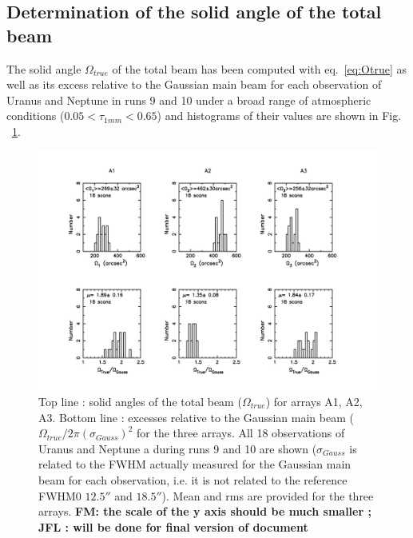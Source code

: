 \subsection{Determination of the solid angle of the total beam}
\label{ap:aperture_photometry_solang}


The solid angle $\Omega_{true}$ of the total beam has been computed with  eq.~\ref{eq:Otrue}
as well as its excess relative to the Gaussian main beam 
for each  observation of Uranus and Neptune in  runs 9 and 10 under a broad range of atmospheric conditions
($0.05 < \tau_{1mm} < 0.65$)  and histograms of their values are shown in Fig. ~\ref{fig:Otrue}.

\begin{figure}[th]
\begin{center}
  \includegraphics[clip, angle=0, scale=0.6]{Figures/Hist_omega_true_and_excess.pdf}
  \caption[Total beam and Gaussian beam solid angles]{Top line : solid angles of the total beam
    ($\Omega_{true}$) for arrays A1, A2, A3. Bottom line :  excesses relative to the Gaussian main beam
   ($\Omega_{true} / 2 \pi (\sigma_{Gauss})^2$ for the three
   arrays. All 18 observations of Uranus and Neptune a
   during runs 9 and 10 are shown ($\sigma_{Gauss}$ is related to the FWHM actually measured for the
   Gaussian main beam for each observation, i.e. it is not related to the reference FWHM0 $12.5''$ and $18.5''$).
   Mean and rms are provided for the three arrays. {\bf FM: the scale of the
     y axis should be much smaller ; JFL : will be done for final
    version of document}}
\label{fig:Otrue}
\end{center}
\end{figure}

